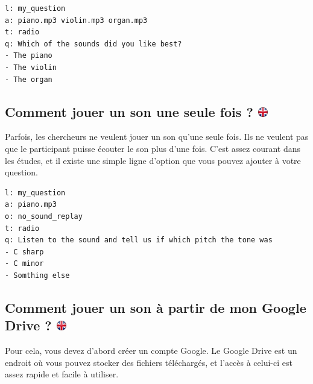 \documentclass[
]{book}
\begin{document}
\begin{verbatim}
l: my_question
a: piano.mp3 violin.mp3 organ.mp3
t: radio
q: Which of the sounds did you like best?
- The piano
- The violin
- The organ
\end{verbatim}

\hypertarget{comment-jouer-un-son-une-seule-fois}{%
\subsection[Comment jouer un son une seule fois ? ]{\texorpdfstring{Comment jouer un son une seule fois ? \href{https://www.psytoolkit.org/lessons/surveyaudiovideo.html\#_how_to_play_a_sound_only_one_time}{\protect\includegraphics{img/ukflag.png}}}{Comment jouer un son une seule fois ? }}\label{comment-jouer-un-son-une-seule-fois}}

Parfois, les chercheurs ne veulent jouer un son qu'une seule fois. Ils ne veulent pas que le participant puisse écouter le son plus d'une fois. C'est assez courant dans les études, et il existe une simple ligne d'option que vous pouvez ajouter à votre question.

\begin{verbatim}
l: my_question
a: piano.mp3
o: no_sound_replay
t: radio
q: Listen to the sound and tell us if which pitch the tone was
- C sharp
- C minor
- Somthing else
\end{verbatim}

\hypertarget{comment-jouer-un-son-uxe0-partir-de-mon-google-drive}{%
\subsection[Comment jouer un son à partir de mon Google Drive ? ]{\texorpdfstring{Comment jouer un son à partir de mon Google Drive ? \href{https://www.psytoolkit.org/lessons/surveyaudiovideo.html\#_how_to_play_a_sound_from_my_google_drive}{\protect\includegraphics{img/ukflag.png}}}{Comment jouer un son à partir de mon Google Drive ? }}\label{comment-jouer-un-son-uxe0-partir-de-mon-google-drive}}

Pour cela, vous devez d'abord créer un compte Google. Le Google Drive est un endroit où vous pouvez stocker des fichiers téléchargés, et l'accès à celui-ci est assez rapide et facile à utiliser.
\end{document}
